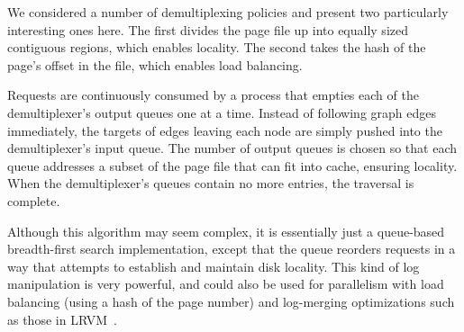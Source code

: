 \documentclass[10pt,letterpaper,twocolumn,english]{article}
\newcommand{\rcs}[1]{\textcolor{green}{\bf RCS: #1}}
\begin{document}
We considered a number of demultiplexing policies and present two
particularly interesting ones here.  The first divides the page file
up into equally sized contiguous regions, which enables locality.  The second takes the hash
of the page's offset in the file, which enables load balancing.

Requests are continuously consumed by a process that empties each of
the demultiplexer's output queues one at a time.  Instead of following
graph edges immediately, the targets of edges leaving each node are
simply pushed into the demultiplexer's input queue.  The number of
 output queues is chosen so that each queue addresses a
subset of the page file that can fit into cache, ensuring locality.  When the
demultiplexer's queues contain no more entries, the traversal is
complete.  

Although this algorithm may seem complex, it is essentially just a
queue-based breadth-first search implementation, except that the queue
reorders requests in a way that attempts to establish and maintain
disk locality.  This kind of log manipulation is very powerful, and
could also be used for parallelism with load balancing (using a hash
of the page number) and log-merging optimizations such as those in
LRVM~\cite{LRVM}.



\end{document}
